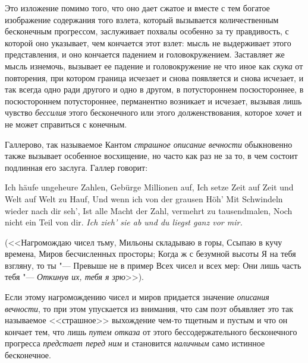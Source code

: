 Это изложение помимо того, что оно дает сжатое и вместе с тем богатое
изображение содержания того взлета, который вызывается количественным
бесконечным прогрессом, заслуживает похвалы особенно за ту правдивость, с
которой оно указывает, чем кончается этот взлет: мысль не выдерживает этого
представления, и оно кончается падением и головокружением. Заставляет же
мысль изнемочь, вызывает ее падение и головокружение не что иное как
{\em скука} от повторения, при котором граница исчезает
и снова появляется и снова исчезает, и так всегда одно ради другого и одно
в другом, в потустороннем посюстороннее, в посюстороннем потустороннее,
перманентно возникает и исчезает, вызывая лишь чувство
{\em бессилия} этого бесконечного или этого
долженствования, которое хочет и не может справиться с конечным.

Галлерово, так называемое Кантом {\em страшное описание
вечности} обыкновенно также вызывает особенное восхищение, но часто как раз
не за то, в чем состоит подлинная его заслуга.
Галлер говорит:

\begin{poem}
Ich häufe ungeheure Zahlen, \verseline
Gebürge Millionen auf, \verseline
Ich setze Zeit auf Zeit und Welt auf Welt zu Hauf, \verseline
Und wenn ich von der grausen Höh' \verseline
Mit Schwindeln wieder nach dir seh', \verseline
Ist alle Macht der Zahl, vermehrt zu tausendmalen, \verseline
Noch nicht ein Teil von dir. \verseline
{\em Ich zieh' sie ab und du liegst ganz vor mir.}
\end{poem}

\begin{poem}
(<<Нагромождаю чисел тьму, \verseline
Мильоны складываю в горы, \verseline
Ссыпаю в кучу времена, \verseline
Миров бесчисленных просторы; \verseline
Когда ж с безумной высоты \verseline
Я на тебя взгляну, то ты "--- \verseline
Превыше не в пример \verseline
Всех чисел и всех мер: \verseline
Они лишь часть тебя "--- \verseline
{\em Откинув их, тебя я зрю}>>).
\end{poem}

Если этому нагромождению чисел и миров придается значение
{\em описания вечности}, то при этом упускается из
внимания, что сам поэт объявляет это так называемое <<страшное>> выхождение
чем-то тщетным и пустым и что он кончает тем, что лишь
{\em путем отказа} от этого бессодержательного
бесконечного прогресса {\em предстает перед ним} и
становится {\em наличным} само истинное бесконечное.

